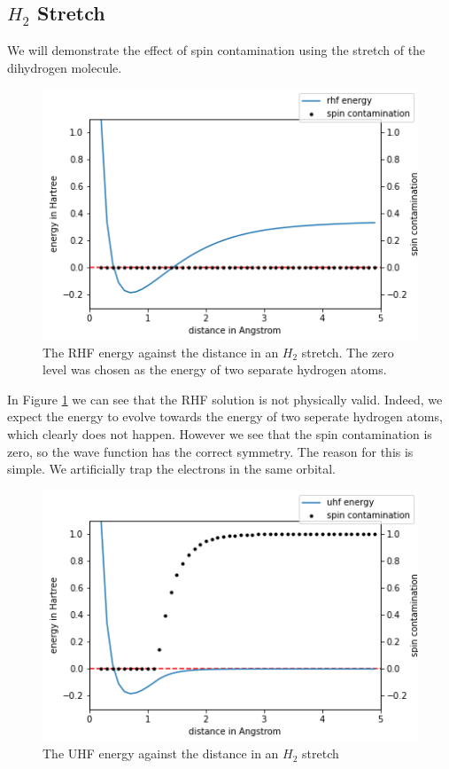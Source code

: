 \documentclass[twoside,twocolumn,9pt]{article}
\begin{document}
\subsection{$H_2$ Stretch}
We will demonstrate the effect of spin contamination using the stretch of the dihydrogen molecule.
\begin{center}
  \begin{figure}[h]
      \includegraphics[width=\linewidth]{./../notes/figures/rhf.png}
      \caption{The RHF energy against the distance in an $H_2$ stretch. The zero level was chosen as the energy of two separate hydrogen atoms.}
      \label{fig:rhfstretch}
  \end{figure}
\end{center}
In Figure \ref{fig:rhfstretch} we can see that the RHF solution is not physically valid. Indeed, we expect the energy to evolve towards the energy of two seperate hydrogen atoms, which clearly does not happen. However we see that the spin contamination is zero, so the wave function has the correct symmetry. The reason for this is simple. We artificially trap the electrons in the same orbital.
\begin{center}
\begin{figure}[h]
  \includegraphics[width=\linewidth]{./../notes/figures/uhf.png}
  \caption{The UHF energy against the distance in an $H_2$ stretch}
  \label{fig:uhfstretch}
\end{figure}
\end{center}
\end{document}
